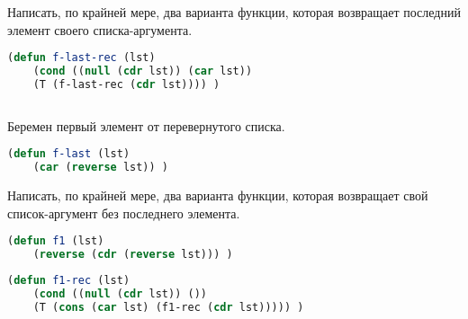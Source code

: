 \documentclass[a4paper,oneside,12pt]{extreport}
\begin{document}
\begin{task}
    Написать, по крайней мере, два варианта функции, которая возвращает последний элемент своего списка-аргумента.

    \begin{lstlisting}[language=Lisp]
(defun f-last-rec (lst)
    (cond ((null (cdr lst)) (car lst))
    (T (f-last-rec (cdr lst)))) )
    
    \end{lstlisting}

Беремен первый элемент от перевернутого списка.
    \begin{lstlisting}[language=Lisp]
(defun f-last (lst)
    (car (reverse lst)) )
    \end{lstlisting}
\end{task}

\begin{task}
    Написать, по крайней мере, два варианта функции, которая возвращает свой список-аргумент без последнего элемента.

    \begin{lstlisting}[language=Lisp]
(defun f1 (lst)
    (reverse (cdr (reverse lst))) )
    \end{lstlisting}
    
    \vspace*{4.5em plus .6em minus .5em}

    \begin{lstlisting}[language=Lisp]
(defun f1-rec (lst)
    (cond ((null (cdr lst)) ())
    (T (cons (car lst) (f1-rec (cdr lst))))) )
    \end{lstlisting}
\end{task}
\end{document}
